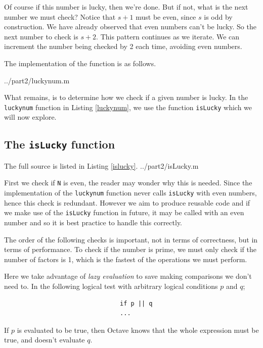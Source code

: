 \documentclass[10pt]{article}
\begin{document}
Of course if this number is lucky, then we're done. But if not, what is the next number we must check? Notice that $s + 1$ must be even, since $s$ is odd by construction. We have already observed that even numbers can't be lucky. So the next number to check is $s+2$. This pattern continues as we iterate. We can increment the number being checked by 2 each time, avoiding even numbers.

The implementation of the function is as follows. 

   {../part2/luckynum.m}

What remains, is to determine how we check if a given number is lucky. In the \texttt{luckynum} function in Listing \ref{luckynum}, we use the function \texttt{isLucky} which we will now explore.

  
\subsection{The \texttt{isLucky} function}

The full source is listed in Listing \ref{islucky}.
   {../part2/isLucky.m}
  
First we check if \texttt{N} is even, the reader may wonder why this is needed. Since the implementation of the \texttt{luckynum} function never calls \texttt{isLucky} with even numbers, hence this check is redundant. However we aim to produce reusable code and if we make use of the \texttt{isLucky} function in future, it may be called with an even number and so it is best practice to handle this correctly.

The order of the following checks is important, not in terms of correctness, but in terms of performance.  To check if the number is prime, we must only check if the number of factors is 1, which is the fastest of the operations we must perform.

Here we take advantage of \emph{lazy evaluation} to save making comparisons we don't need to. In the following logical test with arbitrary logical conditions $p$ and $q$;

\begin{verbatim}
                                if p || q
                                ...
\end{verbatim}

If $p$ is evaluated to be true, then Octave knows that the whole expression must be true, and doesn't evaluate $q$. 
\end{document}

